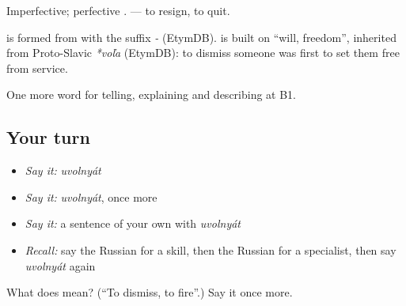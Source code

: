 Imperfective; perfective \emph{}. \emph{} — to resign, to quit.

\begin{cousinweb}
\textbf{} is formed from \emph{} with the suffix \emph{-} (EtymDB). \emph{} is built on \emph{} \textquotedblleft{}will, freedom\textquotedblright{}, inherited from Proto-Slavic \emph{*voľa} (EtymDB): to dismiss someone was first to set them free from service.
\end{cousinweb}

\begin{grammarlens}[title={What you've built}]
One more word for telling, explaining and describing at B1.
\end{grammarlens}

\subsection*{Your turn}
\begin{itemize}
\raggedright
  \item \emph{Say it:} \emph{uvolnyát}
  \item \emph{Say it:} \emph{uvolnyát}, once more
  \item \emph{Say it:} a sentence of your own with \emph{uvolnyát}
  \item \emph{Recall:} say the Russian for a skill, then the Russian for a specialist, then say \emph{uvolnyát} again
\end{itemize}

\begin{tcolorbox}[breakable,colback=teal!4,colframe=teal!35!black,title={Before you move on}]
What does  mean? (\textquotedblleft{}To dismiss, to fire\textquotedblright{}.) Say it once more.
\end{tcolorbox}
